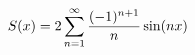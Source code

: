 \documentclass[preview]{standalone}
\begin{document}
\begin{align*}
\special{dvisvgm:raw <g id='unique000'>}S(x)=2\sum_{n=1}^{\infty}\frac{(-1)^{n+1}}{n}\sin(nx)\special{dvisvgm:raw </g>}
\end{align*}
\end{document}
